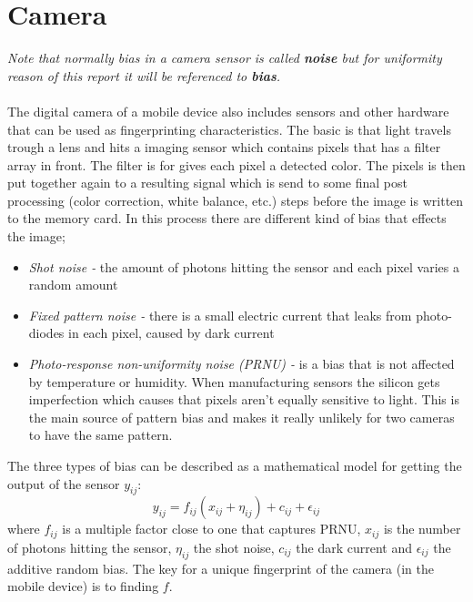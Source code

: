 \section{Camera}\label{sec:char:camera}
\textit{Note that normally bias in a camera sensor is called \textbf{noise} but for uniformity reason of this report it will be referenced to \textbf{bias}.}\\
\\
The digital camera of a mobile device also includes sensors and other hardware that can be used as fingerprinting characteristics. The basic is that light travels trough a lens and hits a imaging sensor which contains pixels that has a filter array in front. The filter is for gives each pixel a detected color. The pixels is then put together again to a resulting signal which is send to some final post processing (color correction, white balance, etc.) steps before the image is written to the memory card. In this process there are different kind of bias that effects the image;
\begin{itemize}
	\item[] \textit{Shot noise -} the amount of photons hitting the sensor and each pixel varies a random amount
	\item[] \textit{Fixed pattern noise - }there is a small electric current that leaks from photo-diodes in each pixel, caused by dark current
	\item[] \textit{Photo-response non-uniformity noise (PRNU) -} is a bias that is not affected by temperature or humidity. When manufacturing sensors the silicon gets imperfection which causes that pixels aren't equally sensitive to light. This is the main source of pattern bias and makes it really unlikely for two cameras to have the same pattern.
\end{itemize}
The three types of bias can be described as a mathematical model for getting the output of the sensor $y_{ij}$:
$$y_{ij}=f_{ij}(x_{ij}+\eta_{ij})+c_{ij}+\epsilon_{ij}$$
where $f_{ij}$ is a multiple factor close to one that captures PRNU, $x_{ij}$ is the number of photons hitting the sensor, $\eta_{ij}$ the shot noise, $c_{ij}$ the dark current and $\epsilon_{ij}$ the additive random bias. The key for a unique fingerprint of the camera (in the mobile device) is to finding $f$.
\cite[]{sensor:camera:DCIdent}


